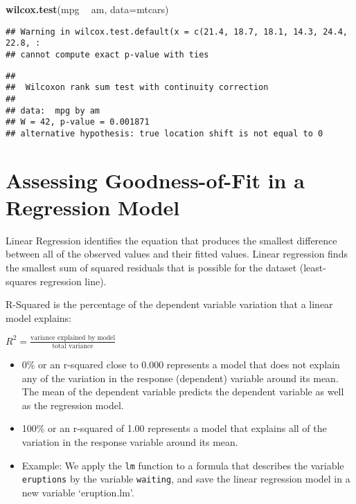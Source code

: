 \documentclass[
]{article}
\newenvironment{Shaded}{\begin{snugshade}}{\end{snugshade}}
\newcommand{\DataTypeTok}[1]{\textcolor[rgb]{0.13,0.29,0.53}{#1}}
\newcommand{\KeywordTok}[1]{\textcolor[rgb]{0.13,0.29,0.53}{\textbf{#1}}}
\newcommand{\NormalTok}[1]{#1}
\newcommand{\OperatorTok}[1]{\textcolor[rgb]{0.81,0.36,0.00}{\textbf{#1}}}
\newcommand{\StringTok}[1]{\textcolor[rgb]{0.31,0.60,0.02}{#1}}
\begin{document}
\begin{Shaded}
\begin{Highlighting}[]
\KeywordTok{wilcox.test}\NormalTok{(mpg }\OperatorTok{~}\StringTok{ }\NormalTok{am, }\DataTypeTok{data=}\NormalTok{mtcars)}
\end{Highlighting}
\end{Shaded}

\begin{verbatim}
## Warning in wilcox.test.default(x = c(21.4, 18.7, 18.1, 14.3, 24.4, 22.8, :
## cannot compute exact p-value with ties
\end{verbatim}

\begin{verbatim}
## 
##  Wilcoxon rank sum test with continuity correction
## 
## data:  mpg by am
## W = 42, p-value = 0.001871
## alternative hypothesis: true location shift is not equal to 0
\end{verbatim}

\hypertarget{assessing-goodness-of-fit-in-a-regression-model}{%
\section{Assessing Goodness-of-Fit in a Regression
Model}\label{assessing-goodness-of-fit-in-a-regression-model}}

Linear Regression identifies the equation that produces the smallest
difference between all of the observed values and their fitted values.
Linear regression finds the smallest sum of squared residuals that is
possible for the dataset (least-squares regression line).

R-Squared is the percentage of the dependent variable variation that a
linear model explains:

\(R^2 = \frac{\text{variance explained by model}}{\text{total variance}}\)

\begin{itemize}
\item
  0\% or an r-squared close to 0.000 represents a model that does not
  explain any of the variation in the response (dependent) variable
  around its mean. The mean of the dependent variable predicts the
  dependent variable as well as the regression model.
\item
  100\% or an r-squared of 1.00 represents a model that explains all of
  the variation in the response variable around its mean.
\item
  Example: We apply the \texttt{lm} function to a formula that describes
  the variable \texttt{eruptions} by the variable \texttt{waiting}, and
  save the linear regression model in a new variable `eruption.lm'.
\end{itemize}
\end{document}
